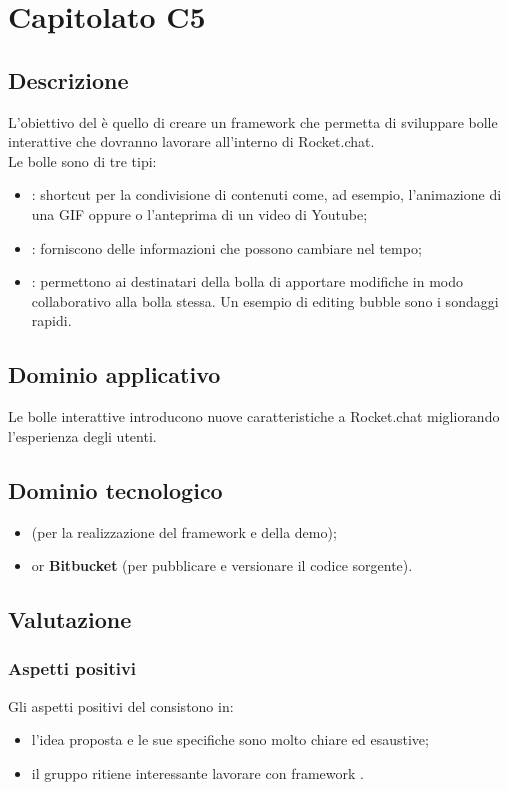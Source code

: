 \section {Capitolato C5}
	\subsection {Descrizione}
		L'obiettivo del  è quello di creare un framework che permetta di sviluppare bolle interattive che dovranno lavorare all'interno di Rocket.chat. \\
		Le bolle sono di tre tipi:
		\begin{itemize}
			\item {}: shortcut per la condivisione di contenuti come, ad esempio, l'animazione di una GIF oppure o l'anteprima di un video di Youtube;
			\item {}: forniscono delle informazioni che possono cambiare nel tempo;
			\item {}: permettono ai destinatari della bolla di apportare modifiche in modo collaborativo alla bolla stessa. Un esempio di editing bubble sono i sondaggi rapidi.
		\end{itemize}
	\subsection {Dominio applicativo}
		Le bolle interattive introducono nuove caratteristiche a Rocket.chat migliorando l'esperienza degli utenti.
	\subsection {Dominio tecnologico}
		\begin{itemize}
		\item \textbf{} (per la realizzazione del framework e della demo);
		\item \textbf{} or \textbf{Bitbucket} (per pubblicare e versionare il codice sorgente).
		\end{itemize}
	\subsection {Valutazione}
		\subsubsection {Aspetti positivi}
		Gli aspetti positivi del  consistono in:
			\begin{itemize}
				\item l’idea proposta e le sue specifiche sono molto chiare ed esaustive;
				\item il gruppo ritiene interessante lavorare con framework .
			\end{itemize}

